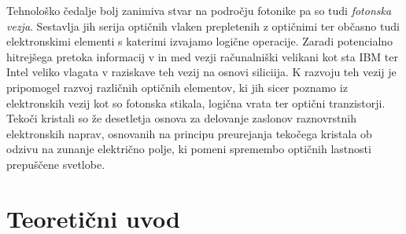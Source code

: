 \documentclass[longbibliography,slovene,a4paper,12pt]{book}
\begin{document}
Tehnološko čedalje bolj zanimiva stvar na področju fotonike pa so tudi \emph{fotonska vezja}. Sestavlja jih serija optičnih vlaken prepletenih z optičnimi ter občasno tudi elektronskimi elementi s katerimi izvajamo logične operacije\cite{siliconphotonics}. Zaradi potencialno hitrejšega pretoka informacij v in med vezji računalniški velikani kot sta IBM ter Intel veliko vlagata v raziskave teh vezij na osnovi siliciija\cite{siliconphotonicsintel}. K razvoju teh vezij je pripomogel razvoj različnih optičnih elementov, ki jih sicer poznamo iz elektronskih vezij kot so fotonska stikala\cite{bose}, logična vrata\cite{espinosa} ter optični tranzistorji\cite{chen}.\\

Tekoči kristali so že desetletja osnova za delovanje zaslonov raznovrstnih elektronskih naprav, osnovanih na principu preurejanja tekočega kristala ob odzivu na zunanje električno polje, ki pomeni spremembo optičnih lastnosti prepuščene svetlobe.

\chapter{Teoretični uvod}
\end{document}
